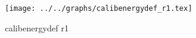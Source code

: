 \begin{figure}[h] \centering \texttt{[image: ../../graphs/calibenergydef\_r1.tex]}\caption{calibenergydef r1}\label{gr:calibenergydef_r1} \end{figure}
